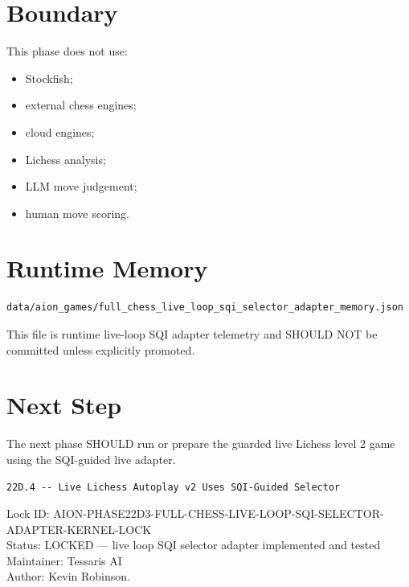 \documentclass[11pt,a4paper]{article}
\begin{document}
\section{Boundary}

This phase does not use:

\begin{itemize}
  \item Stockfish;
  \item external chess engines;
  \item cloud engines;
  \item Lichess analysis;
  \item LLM move judgement;
  \item human move scoring.
\end{itemize}

\section{Runtime Memory}

\begin{verbatim}
data/aion_games/full_chess_live_loop_sqi_selector_adapter_memory.json
\end{verbatim}

This file is runtime live-loop SQI adapter telemetry and SHOULD NOT be committed unless explicitly promoted.

\section{Next Step}

The next phase SHOULD run or prepare the guarded live Lichess level 2 game using the SQI-guided live adapter.

\begin{verbatim}
22D.4 -- Live Lichess Autoplay v2 Uses SQI-Guided Selector
\end{verbatim}

\bigskip

\noindent
Lock ID: AION-PHASE22D3-FULL-CHESS-LIVE-LOOP-SQI-SELECTOR-ADAPTER-KERNEL-LOCK\\
Status: LOCKED --- live loop SQI selector adapter implemented and tested\\
Maintainer: Tessaris AI\\
Author: Kevin Robinson.
\end{document}
